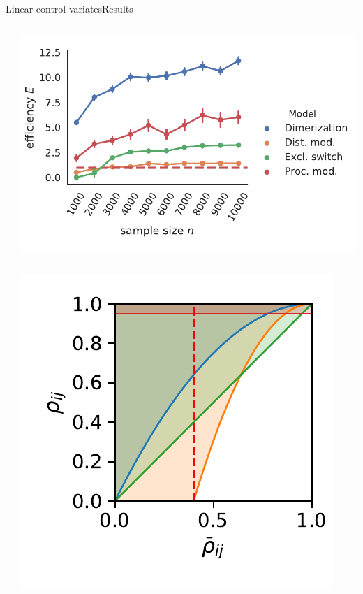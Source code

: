 \documentclass[9pt]{beamer}
\begin{document}
\begin{frame}{Linear control variates}{Results}
    \begin{columns}
        \begin{column}{.05\paperwidth}\end{column}
        \begin{column}{.5\paperwidth}
            \includegraphics[width=\textwidth]{../gfx/sample_size.pdf}
                    \begin{columns}
                        \begin{column}{.6\textwidth}
                            \includegraphics[width=\textwidth]{../gfx/decision_funcs.pdf}

\end{column}
\end{columns}
\end{column}
\end{columns}
\end{frame}
\end{document}
